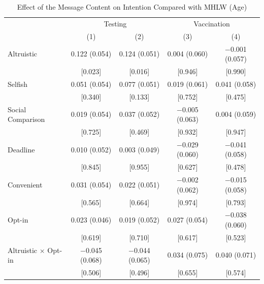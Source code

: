 \documentclass[
    a4paper
]{article}
\begin{document}
\begin{table}

\caption{\label{tab:reg-int-woA}Effect of the Message Content on Intention Compared with MHLW (Age)}
\centering
\fontsize{9}{11}\selectfont
\begin{threeparttable}
\begin{tabular}[t]{lcccc}
\toprule
\multicolumn{1}{c}{ } & \multicolumn{2}{c}{Testing} & \multicolumn{2}{c}{Vaccination} \\
\cmidrule(l{3pt}r{3pt}){2-3} \cmidrule(l{3pt}r{3pt}){4-5}
  & (1) & (2) & (3) & (4)\\
\midrule
Altruistic & \num{0.122} (\num{0.054}) & \num{0.124} (\num{0.051}) & \num{0.004} (\num{0.060}) & \num{-0.001} (\num{0.057})\\
 & {}[\num{0.023}] & {}[\num{0.016}] & {}[\num{0.946}] & {}[\num{0.990}]\\
Selfish & \num{0.051} (\num{0.054}) & \num{0.077} (\num{0.051}) & \num{0.019} (\num{0.061}) & \num{0.041} (\num{0.058})\\
 & {}[\num{0.340}] & {}[\num{0.133}] & {}[\num{0.752}] & {}[\num{0.475}]\\
Social Comparison & \num{0.019} (\num{0.054}) & \num{0.037} (\num{0.052}) & \num{-0.005} (\num{0.063}) & \num{0.004} (\num{0.059})\\
 & {}[\num{0.725}] & {}[\num{0.469}] & {}[\num{0.932}] & {}[\num{0.947}]\\
Deadline & \num{0.010} (\num{0.052}) & \num{0.003} (\num{0.049}) & \num{-0.029} (\num{0.060}) & \num{-0.041} (\num{0.058})\\
 & {}[\num{0.845}] & {}[\num{0.955}] & {}[\num{0.627}] & {}[\num{0.478}]\\
Convenient & \num{0.031} (\num{0.054}) & \num{0.022} (\num{0.051}) & \num{-0.002} (\num{0.062}) & \num{-0.015} (\num{0.058})\\
 & {}[\num{0.565}] & {}[\num{0.664}] & {}[\num{0.974}] & {}[\num{0.793}]\\
Opt-in & \num{0.023} (\num{0.046}) & \num{0.019} (\num{0.052}) & \num{0.027} (\num{0.054}) & \num{-0.038} (\num{0.060})\\
 & {}[\num{0.619}] & {}[\num{0.710}] & {}[\num{0.617}] & {}[\num{0.523}]\\
Altruistic $\times$ Opt-in & \num{-0.045} (\num{0.068}) & \num{-0.044} (\num{0.065}) & \num{0.034} (\num{0.075}) & \num{0.040} (\num{0.071})\\
 & {}[\num{0.506}] & {}[\num{0.496}] & {}[\num{0.655}] & {}[\num{0.574}]\\

\end{tabular}
\end{threeparttable}
\end{table}
\end{document}
